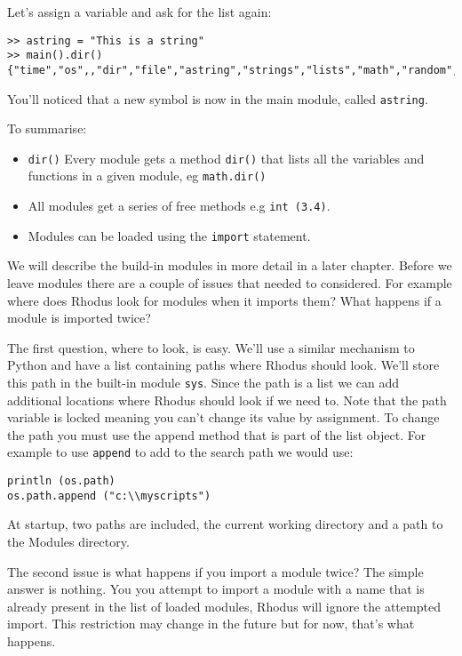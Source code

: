 Let's assign a variable and ask for the list again:

\begin{lstlisting}
>> astring = "This is a string"
>> main().dir()
{"time","os",,"dir","file","astring","strings","lists","math","random","sys"}
\end{lstlisting}

You'll noticed that a new symbol is now in the main module, called {\tt astring}.

To summarise:

\begin{itemize}
\item {\tt dir()} Every module gets a method {\tt dir()} that lists all the variables and functions in a given module, eg {\tt math.dir()}
\item All modules get a series of free methods e.g {\tt int (3.4)}.
\item Modules can be loaded using the {\tt import} statement.
\end{itemize}

We will describe the build-in modules in more detail in a later chapter. Before we leave modules there are a couple of issues that needed to considered. For example where does Rhodus look for modules when it imports them? What happens if a module is imported twice?

The first question, where to look, is easy. We'll use a similar mechanism to Python and have a list containing paths where Rhodus should look. We'll store this path in the built-in module {\tt sys}. Since the path is a list we can add additional locations where Rhodus should look if we need to. Note that the path variable is locked meaning you can't change its value by assignment. To change the path you must use the append method that is part of the list object. For example to use {\tt append} to add to the search path we would use:

\begin{lstlisting}
println (os.path)
os.path.append ("c:\\myscripts")
\end{lstlisting}

At startup, two paths are included, the current working directory and a path to the Modules directory.

The second issue is what happens if you import a module twice? The simple answer is nothing. You you attempt to import a module with a name that is already present in the list of loaded modules, Rhodus will ignore the attempted import. This restriction may change in the future but for now, that's what happens.

